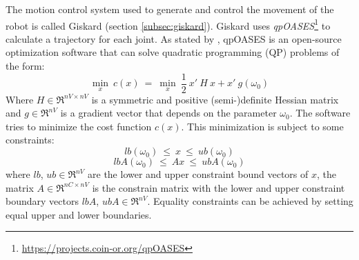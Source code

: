 The motion control system used  to generate and control the movement of the robot is called Giskard (section \ref{subsec:giskard}). Giskard uses \textit{qpOASES}\footnote{\url{https://projects.coin-or.org/qpOASES}}  to calculate a trajectory for each joint. As stated by \citet{qpoases},  qpOASES is an open-source optimization software that can solve quadratic programming (QP) problems of the form:
\begin{equation}
\underset{x}{\min}\ c(x)\ =\  \underset{x}{\min}\ \frac{1}{2} \ x' \ H \ x + x' \ g(\omega_{0})
\label{eq:cost_in}
\end{equation}
Where $H \in \Re^{nV\times nV}$ is a symmetric and positive (semi-)definite Hessian matrix and $g \in \Re^{nV}$ is a gradient vector that depends on the parameter $\omega_{0}$. The software tries to minimize the cost function $c(x)$. This minimization is subject to some constraints:
$$lb(\omega_{0})\ \leq\ x\ \leq\ ub(\omega_{0})$$
$$lbA(\omega_{0})\ \leq\ Ax\ \leq\ ubA(\omega_{0})$$
where $lb$, $ub \in \Re^{nV}$ are the lower and upper constraint bound vectors of $x$, the matrix $A \in \Re^{nC\times nV}$ is the constrain matrix with the lower and upper constraint boundary vectors $lbA$, $ubA \in \Re^{nV}$. Equality constraints can be achieved by setting equal upper and lower boundaries.
 
